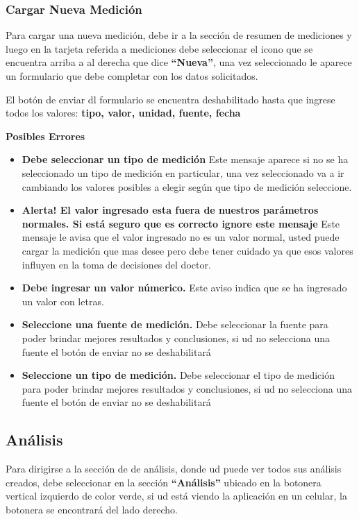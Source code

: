 \subsubsection{Cargar Nueva Medición}
Para cargar una nueva medición, debe ir a la sección de resumen de mediciones y luego en la tarjeta referida a mediciones debe seleccionar el icono que se encuentra arriba a al derecha que dice \textbf{``Nueva''}, una vez seleccionado le aparece un formulario que debe completar con los datos solicitados.

El botón de enviar dl formulario se encuentra deshabilitado hasta que ingrese todos los valores:
\textbf{tipo, valor, unidad, fuente, fecha}


\textbf{Posibles Errores}
\begin{itemize}
	\item \textbf{Debe seleccionar un tipo de medición} Este mensaje aparece si no se ha seleccionado un tipo de medición en particular, una vez seleccionado va a ir cambiando los valores posibles a elegir según que tipo de medición seleccione.
	\item \textbf{Alerta! El valor ingresado esta fuera de nuestros parámetros normales. Si está seguro que es correcto ignore este mensaje} Este mensaje le avisa que el valor ingresado no es un valor normal, usted puede cargar la medición que mas desee pero debe tener cuidado ya que esos valores influyen en la toma de decisiones del doctor.
	\item \textbf{Debe ingresar un valor númerico.} Este aviso indica que se ha ingresado un valor con letras.
	\item \textbf{Seleccione una fuente de medición.} Debe seleccionar la fuente para poder brindar mejores resultados y conclusiones, si ud no selecciona una fuente el botón de enviar no se deshabilitará
	\item \textbf{Seleccione un tipo de medición.} Debe seleccionar el tipo de medición para poder brindar mejores resultados y conclusiones, si ud no selecciona una fuente el botón de enviar no se deshabilitará
\end{itemize}


\subsection{Análisis}
Para dirigirse a la sección de  de análisis, donde ud puede ver todos sus análisis creados, debe seleccionar en la sección \textbf{``Análisis''} ubicado en la botonera vertical izquierdo de color verde, si ud está viendo la aplicación en un celular, la botonera se encontrará del lado derecho.

